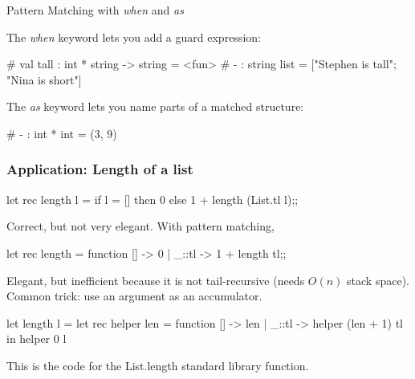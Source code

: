 \documentclass{plt}
\begin{document}
\begin{frame}[fragile]{Pattern Matching with \emph{when} and \emph{as}}

The \emph{when} keyword lets you add a guard expression:

\begin{interactive}
#  
val tall : int * string -> string = <fun>
# 
- : string list = ["Stephen is tall"; "Nina is short"]
\end{interactive}

The \emph{as} keyword lets you name parts of a matched structure:

\begin{interactive}
# 
- : int * int = (3, 9)
\end{interactive}

\end{frame}

\begin{frame}[fragile]
  \frametitle{Application: Length of a list}

\begin{ocaml}
let rec length l =
  if l = [] then 0 else 1 + length (List.tl l);;
\end{ocaml}

Correct, but not very elegant.  With pattern matching,

\begin{ocaml}
let rec length = function
   []    -> 0
 | _::tl -> 1 + length tl;;
\end{ocaml}

Elegant, but inefficient because it is not tail-recursive (needs
$O(n)$ stack space).  Common trick: use an argument as an accumulator.

\begin{ocaml}
let length l =
  let rec helper len = function
      []    -> len
    | _::tl -> helper (len + 1) tl
  in helper 0 l
\end{ocaml}

This is the code for the List.length standard library function.

\end{frame}
\end{document}

